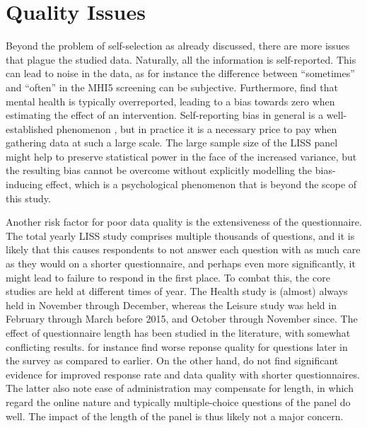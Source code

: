\section{Quality Issues}
\label{sec:data:quality}
Beyond the problem of self-selection as already discussed, there are more issues that plague the studied data.
Naturally, all the information is self-reported. This can lead to noise in the data, as for instance the difference
between ``sometimes'' and ``often'' in the MHI5 screening can be subjective. Furthermore,  find that
mental health is typically overreported, leading to a bias towards zero when estimating the effect of an intervention.
Self-reporting bias in general is a well-established phenomenon \cite{rosenman2011measuring}, but in practice it is a
necessary price to pay when gathering data at such a large scale. The large sample size of the LISS panel might
help to preserve statistical power in the face of the increased variance, but the resulting bias cannot be overcome
without explicitly modelling the bias-inducing effect, which is a psychological phenomenon that is beyond the scope of this study.

Another risk factor for poor data quality is the extensiveness of the questionnaire. The total yearly LISS study
comprises multiple thousands of questions, and it is likely that this causes respondents to not answer each question
with as much care as they would on a shorter questionnaire, and perhaps even more significantly, it might lead to
failure to respond in the first place.
To combat this, the core studies are held at different times of year. The Health study is (almost) always held in November
through December, whereas the Leisure study was held in February through March before 2015, and October through November since.
The effect of questionnaire length has been studied in the literature, with somewhat conflicting results.  for instance
find worse reponse quality for questions later in the survey as compared to earlier. On the other hand, 
do not find significant evidence for improved response rate and data quality with shorter questionnaires. The latter
also note ease of administration may compensate for length, in which regard the online nature and typically multiple-choice
questions of the panel do well. The impact of the length of the panel is thus likely not a major concern.

